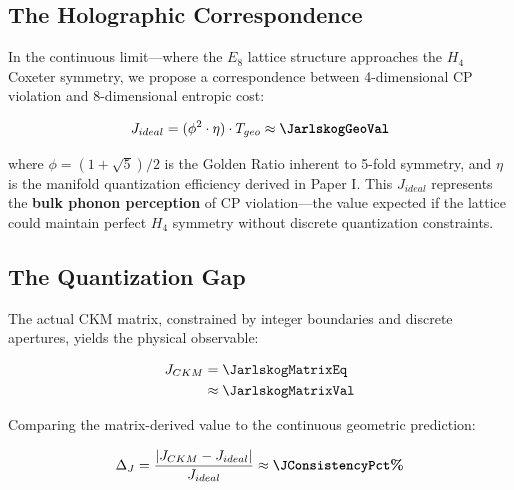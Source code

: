 \subsection{The Holographic Correspondence}
In the continuous limit—where the $E_8$ lattice structure approaches the $H_4$ Coxeter symmetry, we propose a correspondence between 4-dimensional CP violation and 8-dimensional entropic cost:

\begin{equation}
    J_{ideal} = (\phi^2 \cdot \eta) \cdot T_{geo} \approx \textbf{\JarlskogGeoVal}
    \label{eq:golden_shadow}
\end{equation}

where $\phi = (1+\sqrt{5})/2$ is the Golden Ratio inherent to 5-fold symmetry, and $\eta$ is the manifold quantization efficiency derived in Paper I. This $J_{ideal}$ represents the \textbf{bulk phonon perception} of CP violation—the value expected if the lattice could maintain perfect $H_4$ symmetry without discrete quantization constraints.

\subsection{The Quantization Gap}
The actual CKM matrix, constrained by integer boundaries and discrete apertures, yields the physical observable:

\begin{equation}
\begin{split}
    J_{CKM} &= \JarlskogMatrixEq \\
    &\approx \JarlskogMatrixVal
\end{split}
\end{equation}

Comparing the matrix-derived value to the continuous geometric prediction:

\begin{equation}
    \Delta_J = \frac{|J_{CKM} - J_{ideal}|}{J_{ideal}} \approx \textbf{\JConsistencyPct\%}
\end{equation}

